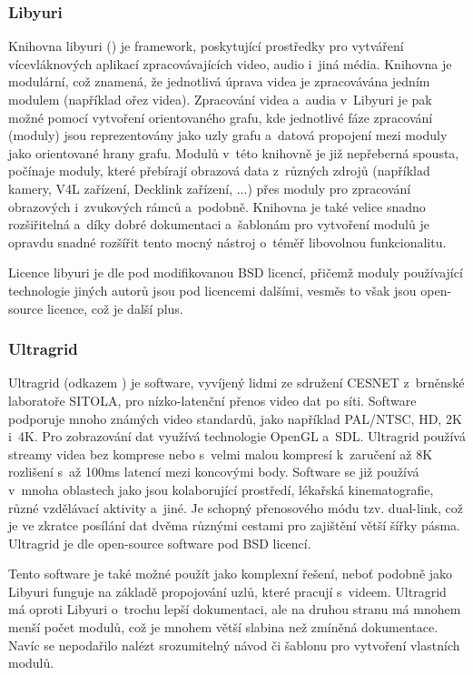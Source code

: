 \documentclass[thesis=M,czech]{FITthesis}[2012/06/26]
\begin{document}
\subsubsection{Libyuri} \label{subsubsec:analyza_reseni_yuri}
Knihovna libyuri (\cite{yuri}) je framework, poskytující prostředky pro vytváření vícevláknových aplikací zpracovávajících video, audio i~jiná média. Knihovna je modulární, což znamená, že jednotlivá úprava videa je zpracovávána jedním modulem (například ořez videa). Zpracování videa a~audia v~Libyuri je pak možné pomocí vytvoření orientovaného grafu, kde jednotlivé fáze zpracování (moduly) jsou reprezentovány jako uzly grafu a~datová propojení mezi moduly jako orientované hrany grafu. Modulů v~této knihovně je již nepřeberná spousta, počínaje moduly, které přebírají obrazová data z~různých zdrojů (například kamery, V4L zařízení, Decklink zařízení, ...) přes moduly pro zpracování obrazových i~zvukových rámců a~podobně. Knihovna je také velice snadno rozšiřitelná a~díky dobré dokumentaci a~šablonám pro vytvoření modulů je opravdu snadné rozšířit tento mocný nástroj o~téměř libovolnou funkcionalitu.

	Licence libyuri je dle \cite{yuri} pod modifikovanou BSD licencí, přičemž moduly používající technologie jiných autorů jsou pod licencemi dalšími, vesměs to však jsou open-source licence, což je další plus.

\subsubsection{Ultragrid} \label{subsubsec:analyza_reseni_ultragrid}
Ultragrid (odkazem \cite{ultragrid_web}) je software, vyvíjený lidmi ze sdružení CESNET z~brněnské laboratoře SITOLA, pro nízko-latenční přenos video dat po síti. Software podporuje mnoho známých video standardů, jako například PAL/NTSC, HD, 2K i~4K. Pro zobrazování dat využívá technologie OpenGL a~SDL. Ultragrid používá streamy videa bez komprese nebo s~velmi malou kompresí k~zaručení až 8K rozlišení s~až 100ms latencí mezi koncovými body. Software se již používá v~mnoha oblastech jako jsou kolaborující prostředí, lékařská kinematografie, různé vzdělávací aktivity a~jiné. Je schopný přenosového módu tzv. dual-link, což je ve zkratce posílání dat dvěma různými cestami pro zajištění větší šířky pásma. Ultragrid je dle \cite{ultragrid_wiki} open-source software pod BSD licencí.
	
	Tento software je také možné použít jako komplexní řešení, neboť podobně jako Libyuri funguje na základě propojování uzlů, které pracují s~videem. Ultragrid má oproti Libyuri o~trochu lepší dokumentaci, ale na druhou stranu má mnohem menší počet modulů, což je mnohem větší slabina než zmíněná dokumentace. Navíc se nepodařilo nalézt srozumitelný návod či šablonu pro vytvoření vlastních modulů.
\end{document}
